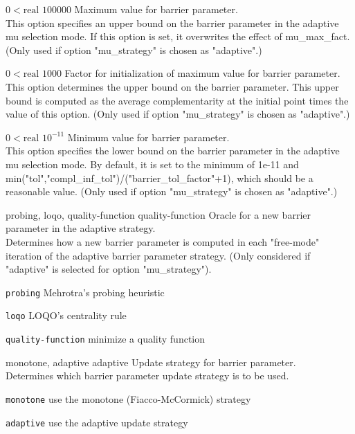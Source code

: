 %
{$0<\textrm{real}$}%
{$100000$}%
{Maximum value for barrier parameter.\\
This option specifies an upper bound on the barrier parameter in the adaptive mu selection mode.  If this option is set, it overwrites the effect of mu\_max\_fact. (Only used if option "mu\_strategy" is chosen as "adaptive".)}%
{}

%
{$0<\textrm{real}$}%
{$1000$}%
{Factor for initialization of maximum value for barrier parameter.\\
This option determines the upper bound on the barrier parameter.  This upper bound is computed as the average complementarity at the initial point times the value of this option. (Only used if option "mu\_strategy" is chosen as "adaptive".)}%
{}

%
{$0<\textrm{real}$}%
{$10^{-11}$}%
{Minimum value for barrier parameter.\\
This option specifies the lower bound on the barrier parameter in the adaptive mu selection mode. By default, it is set to the minimum of 1e-11 and min("tol","compl\_inf\_tol")/("barrier\_tol\_factor"+1), which should be a reasonable value. (Only used if option "mu\_strategy" is chosen as "adaptive".)}%
{}

%
{\ttfamily probing, loqo, quality-function}%
{quality-function}%
{Oracle for a new barrier parameter in the adaptive strategy.\\
Determines how a new barrier parameter is computed in each "free-mode" iteration of the adaptive barrier parameter strategy. (Only considered if "adaptive" is selected for option "mu\_strategy").}%
{\begin{list}{}{
\setlength{\parsep}{0em}
\setlength{\leftmargin}{5ex}
\setlength{\labelwidth}{2ex}
\setlength{\itemindent}{0ex}
\setlength{\topsep}{0pt}}
\item[\texttt{probing}] Mehrotra's probing heuristic
\item[\texttt{loqo}] LOQO's centrality rule
\item[\texttt{quality-function}] minimize a quality function
\end{list}
}

%
{\ttfamily monotone, adaptive}%
{adaptive}%
{Update strategy for barrier parameter.\\
Determines which barrier parameter update strategy is to be used.}%
{\begin{list}{}{
\setlength{\parsep}{0em}
\setlength{\leftmargin}{5ex}
\setlength{\labelwidth}{2ex}
\setlength{\itemindent}{0ex}
\setlength{\topsep}{0pt}}
\item[\texttt{monotone}] use the monotone (Fiacco-McCormick) strategy
\item[\texttt{adaptive}] use the adaptive update strategy
\end{list}
}

